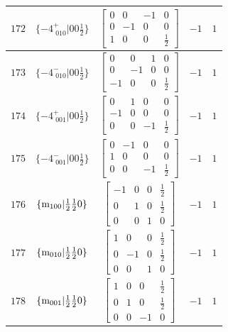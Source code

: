 \documentclass[fleqn,8pt]{jsarticle}
\begin{document}
\begin{longtable}{ccccc}
$ 172 $ & $ \{-4^{+}_{\,\,010}|0 0 \frac{1}{2}\} $ & $ \begin{bmatrix} 0 & 0 & -1 & 0 \\ 0 & -1 & 0 & 0 \\ 1 & 0 & 0 & \frac{1}{2} \end{bmatrix} $ & $ -1 $ & $ 1 $ \\ \hline
$ 173 $ & $ \{-4^{-}_{\,\,010}|0 0 \frac{1}{2}\} $ & $ \begin{bmatrix} 0 & 0 & 1 & 0 \\ 0 & -1 & 0 & 0 \\ -1 & 0 & 0 & \frac{1}{2} \end{bmatrix} $ & $ -1 $ & $ 1 $ \\ \hline
$ 174 $ & $ \{-4^{+}_{\,\,001}|0 0 \frac{1}{2}\} $ & $ \begin{bmatrix} 0 & 1 & 0 & 0 \\ -1 & 0 & 0 & 0 \\ 0 & 0 & -1 & \frac{1}{2} \end{bmatrix} $ & $ -1 $ & $ 1 $ \\ \hline
$ 175 $ & $ \{-4^{-}_{\,\,001}|0 0 \frac{1}{2}\} $ & $ \begin{bmatrix} 0 & -1 & 0 & 0 \\ 1 & 0 & 0 & 0 \\ 0 & 0 & -1 & \frac{1}{2} \end{bmatrix} $ & $ -1 $ & $ 1 $ \\ \hline
$ 176 $ & $ \{{\rm m}_{100}|\frac{1}{2} \frac{1}{2} 0\} $ & $ \begin{bmatrix} -1 & 0 & 0 & \frac{1}{2} \\ 0 & 1 & 0 & \frac{1}{2} \\ 0 & 0 & 1 & 0 \end{bmatrix} $ & $ -1 $ & $ 1 $ \\ \hline
$ 177 $ & $ \{{\rm m}_{010}|\frac{1}{2} \frac{1}{2} 0\} $ & $ \begin{bmatrix} 1 & 0 & 0 & \frac{1}{2} \\ 0 & -1 & 0 & \frac{1}{2} \\ 0 & 0 & 1 & 0 \end{bmatrix} $ & $ -1 $ & $ 1 $ \\ \hline
$ 178 $ & $ \{{\rm m}_{001}|\frac{1}{2} \frac{1}{2} 0\} $ & $ \begin{bmatrix} 1 & 0 & 0 & \frac{1}{2} \\ 0 & 1 & 0 & \frac{1}{2} \\ 0 & 0 & -1 & 0 \end{bmatrix} $ & $ -1 $ & $ 1 $ \\ \hline

\end{longtable}
\end{document}
